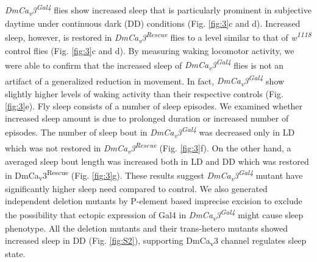\emph{DmCa\textsubscript{v}3\textsuperscript{Gal4}} flies show increased sleep that is particularly prominent in subjective daytime under continuous dark (DD) conditions (Fig. \ref{fig:3}c and d).
Increased sleep, however, is restored in \emph{DmCa\textsubscript{v}3\textsuperscript{Rescue}} flies to a level similar to that of \emph{w\textsuperscript{1118}} control flies (Fig. \ref{fig:3}c and d).
By measuring waking locomotor activity, we were able to confirm that the increased sleep of \emph{DmCa\textsubscript{v}3\textsuperscript{Gal4}} flies is not an artifact of a generalized reduction in movement. In fact, \emph{DmCa\textsubscript{v}3\textsuperscript{Gal4}} show slightly higher levels of waking activity than their respective controls (Fig. \ref{fig:3}e).
Fly sleep consists of a number of sleep episodes.
We examined whether increased sleep amount is due to prolonged duration or increased number of episodes.
The number of sleep bout in \emph{DmCa\textsubscript{v}3\textsuperscript{Gal4}} was decreased only in LD which was not restored in \emph{DmCa\textsubscript{v}3\textsuperscript{Rescue}} (Fig. \ref{fig:3}f).
On the other hand, a averaged sleep bout length was increased both in LD and DD which was restored in DmCa\textsubscript{v}3\textsuperscript{Rescue} (Fig. \ref{fig:3}g).
These results suggest \emph{DmCa\textsubscript{v}3\textsuperscript{Gal4}} mutant have significantly higher sleep need compared to control.
We also generated independent deletion mutants by P-element based imprecise excision to exclude the possibility that ectopic expression of Gal4 in \emph{DmCa\textsubscript{v}3\textsuperscript{Gal4}} might cause sleep phenotype.
All the deletion mutants and their trans-hetero mutants showed increased sleep in DD (Fig. \ref{fig:S2}), supporting DmCa\textsubscript{v}3 channel regulates sleep state.
    
  
  
  
  
  
  